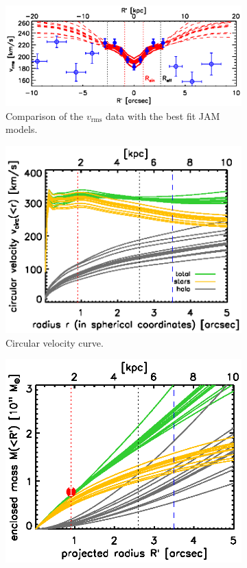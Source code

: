 \begin{figure}
\centering
\begin{subfigure}{\textwidth}
  \centering
  \includegraphics[width=0.8\linewidth]{fig/B4_rms_error_curves.ps}
  \caption{Comparison of the $v_\text{rms}$ data with the best fit JAM models.}
  \label{fig:modelB4_vrms}
\end{subfigure}
\begin{subfigure}{.48\textwidth}
  \centering
  \includegraphics[width=0.9\linewidth]{fig/B4_jam_profiles_errors_short_vcirc.ps}
  \caption{Circular velocity curve.}
  \label{fig:modelB4_vcirc}
\end{subfigure}%
\hspace{.02\textwidth}
\begin{subfigure}{.48\textwidth}
  \centering
  \includegraphics[width=0.9\linewidth]{fig/B4_jam_profiles_errors_short_projmass.ps}

\end{subfigure}
\end{figure}
